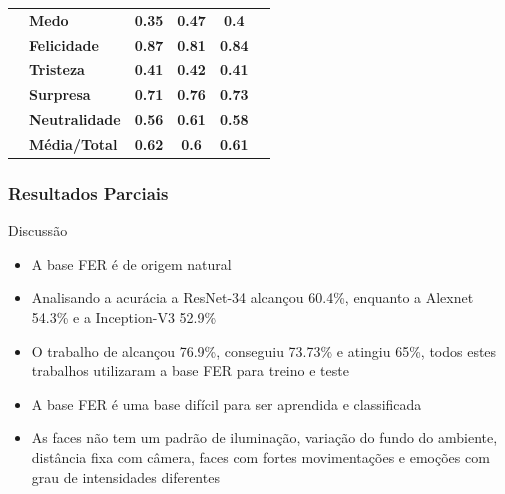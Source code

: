 \documentclass{beamer}
\begin{document}
\begin{frame}
\begin{table}[]
\begin{tabular}{llcccc}
                                       & \textbf{Medo}         & \textbf{0.35}                         & \textbf{0.47}                          & \textbf{0.4}                          &                                       \\
                                       & \textbf{Felicidade}   & \textbf{0.87}                         & \textbf{0.81}                          & \textbf{0.84}                         &                                       \\
                                       & \textbf{Tristeza}     & \textbf{0.41}                         & \textbf{0.42}                          & \textbf{0.41}                         &                                       \\
                                       & \textbf{Surpresa}     & \textbf{0.71}                         & \textbf{0.76}                          & \textbf{0.73}                         &                                       \\
                                       & \textbf{Neutralidade} & \textbf{0.56}                         & \textbf{0.61}                          & \textbf{0.58}                         &                                       \\
                                       & \textbf{Média/Total}  & \textbf{0.62}                         & \textbf{0.6}                           & \textbf{0.61}                         &                                       \\ \hline
\end{tabular}
\end{table}
\end{frame}


\begin{frame}
\frametitle{Resultados Parciais}
 \begin{block}{Discussão}
\begin{itemize}
\pause
\item A base FER é de origem natural
\pause
\item Analisando a acurácia a ResNet-34 alcançou 60.4\%, enquanto a Alexnet 54.3\% e a Inception-V3 52.9\%
\pause
\item O trabalho de \cite{art7} alcançou 76.9\%, \cite{kim2016fusing} conseguiu 73.73\% e \cite{art5} atingiu 65\%, todos estes trabalhos utilizaram a base FER para treino e teste
\pause
\item A base FER é uma base difícil para ser aprendida e classificada
\pause
\item As faces não tem um padrão de iluminação, variação do fundo do ambiente, distância fixa com câmera, faces com fortes movimentações e emoções com grau de intensidades diferentes
\end{itemize}
\end{block}
\end{frame}
\end{document}
